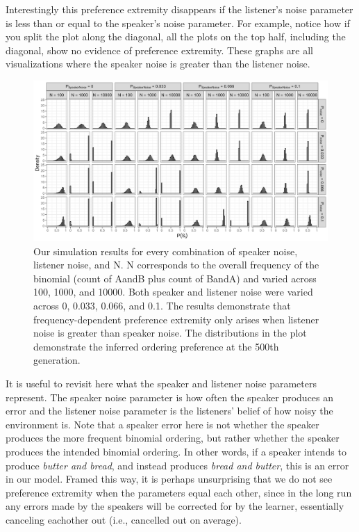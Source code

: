 \documentclass[10pt, letterpaper]{article}
\newenvironment{CodeChunk}{}{}
\begin{document}
Interestingly this preference extremity disappears if the listener's
noise parameter is less than or equal to the speaker's noise parameter.
For example, notice how if you split the plot along the diagonal, all
the plots on the top half, including the diagonal, show no evidence of
preference extremity. These graphs are all visualizations where the
speaker noise is greater than the listener noise.

\begin{CodeChunk}
\begin{figure}[!htb]
\includegraphics[width=1\linewidth]{Figures/full_plot_smaller} \caption[Our simulation results for every combination of speaker noise, listener noise, and N]{Our simulation results for every combination of speaker noise, listener noise, and N. N corresponds to the overall frequency of the binomial (count of AandB plus count of BandA) and varied across 100, 1000, and 10000. Both speaker and listener noise were varied across 0, 0.033, 0.066, and 0.1. The results demonstrate that frequency-dependent preference extremity only arises when listener noise is greater than speaker noise. The distributions in the plot demonstrate the inferred ordering preference at the 500th generation.}\label{fig:fullsimsplot}
\end{figure}
\end{CodeChunk}

It is useful to revisit here what the speaker and listener noise
parameters represent. The speaker noise parameter is how often the
speaker produces an error and the listener noise parameter is the
listeners' belief of how noisy the environment is. Note that a speaker
error here is not whether the speaker produces the more frequent
binomial ordering, but rather whether the speaker produces the intended
binomial ordering. In other words, if a speaker intends to produce
\emph{butter and bread}, and instead produces \emph{bread and butter},
this is an error in our model. Framed this way, it is perhaps
unsurprising that we do not see preference extremity when the parameters
equal each other, since in the long run any errors made by the speakers
will be corrected for by the learner, essentially canceling eachother
out (i.e., cancelled out on average).
\end{document}
